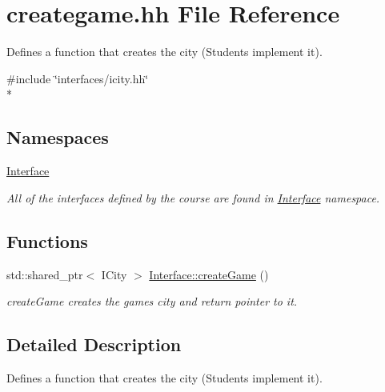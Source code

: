 \hypertarget{creategame_8hh}{\section{creategame.\-hh File Reference}
\label{creategame_8hh}
}


Defines a function that creates the city (Students implement it).  


{\ttfamily \#include \char`\"{}interfaces/icity.\-hh\char`\"{}}\\*
\subsection*{Namespaces}
\begin{DoxyCompactItemize}
\item 
\hyperlink{namespaceInterface}{Interface}
\begin{DoxyCompactList}\small\item\em All of the interfaces defined by the course are found in \hyperlink{namespaceInterface}{Interface} namespace. \end{DoxyCompactList}\end{DoxyCompactItemize}
\subsection*{Functions}
\begin{DoxyCompactItemize}
\item 
std\-::shared\-\_\-ptr$<$ I\-City $>$ \hyperlink{namespaceInterface_ad71f50d9ef208aaebba5b55f4e529145}{Interface\-::create\-Game} ()
\begin{DoxyCompactList}\small\item\em create\-Game creates the games city and return pointer to it. \end{DoxyCompactList}\end{DoxyCompactItemize}


\subsection{Detailed Description}
Defines a function that creates the city (Students implement it). 